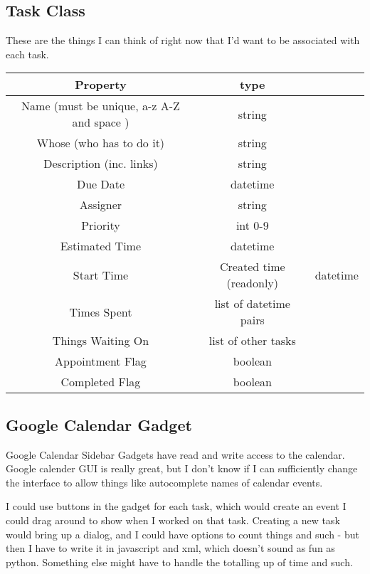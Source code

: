 \documentclass[12pt]{article}
\begin{document}
\subsection{Task Class}
These are the things I can think of right now that I'd want to be associated with each task.
\begin{tabular}{c || c | c }
    Property             & type        \\ \hline
    Name (must be unique, a-z A-Z and space )                & string      \\ \hline
    Whose (who has to do it)               & string      \\ \hline
    Description (inc. links)         & string      \\ \hline
    Due Date             & datetime    \\ \hline
    Assigner             & string      \\ \hline
    Priority             & int 0-9     \\ \hline
    Estimated Time       & datetime    \\ \hline
    Start Time           &
    Created time (readonly)& datetime    \\ \hline
    Times Spent          & list of datetime pairs   \\ \hline
    Things Waiting On    & list of other tasks   \\ \hline
    Appointment Flag     & boolean     \\ \hline
    Completed Flag       & boolean     \\ \hline
\end{tabular}

\subsection{Google Calendar Gadget}
Google Calendar Sidebar Gadgets have read and write access to the calendar.
Google calender GUI is really great, but I don't know if I can sufficiently change
the interface to allow things like autocomplete names of calendar events.

I could use buttons in the gadget for each task, which would create an event I could
drag around to show when I worked on that task.  Creating a new task would bring up
a dialog, and I could have options to count things and such - but then I have to write
it in javascript and xml, which doesn't sound as fun as python.  Something else might
have to handle the totalling up of time and such.
\end{document}
